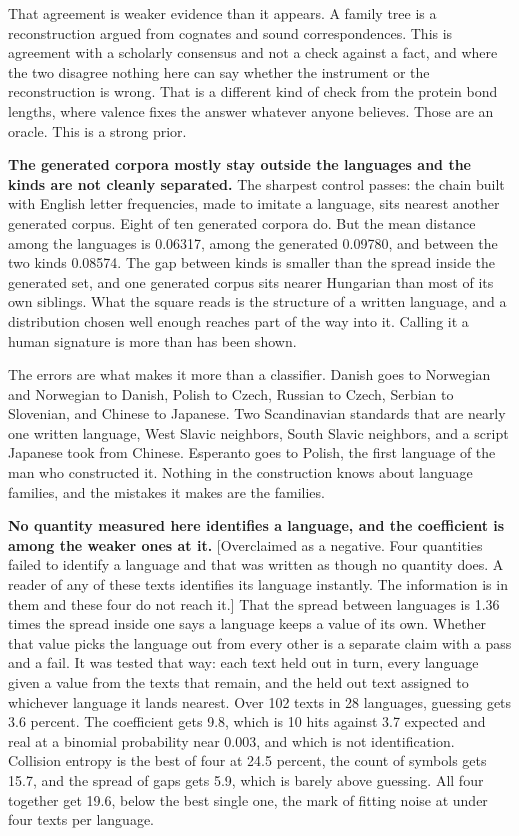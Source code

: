 That agreement is weaker evidence than it appears. A family tree is a reconstruction argued from cognates and sound correspondences. This is agreement with a scholarly consensus and not a check against a fact, and where the two disagree nothing here can say whether the instrument or the reconstruction is wrong. That is a different kind of check from the protein bond lengths, where valence fixes the answer whatever anyone believes. Those are an oracle. This is a strong prior.

\textbf{The generated corpora mostly stay outside the languages and the kinds are not cleanly separated.} The sharpest control passes: the chain built with English letter frequencies, made to imitate a language, sits nearest another generated corpus. Eight of ten generated corpora do. But the mean distance among the languages is 0.06317, among the generated 0.09780, and between the two kinds 0.08574. The gap between kinds is smaller than the spread inside the generated set, and one generated corpus sits nearer Hungarian than most of its own siblings. What the square reads is the structure of a written language, and a distribution chosen well enough reaches part of the way into it. Calling it a human signature is more than has been shown.

The errors are what makes it more than a classifier. Danish goes to Norwegian and Norwegian to Danish, Polish to Czech, Russian to Czech, Serbian to Slovenian, and Chinese to Japanese. Two Scandinavian standards that are nearly one written language, West Slavic neighbors, South Slavic neighbors, and a script Japanese took from Chinese. Esperanto goes to Polish, the first language of the man who constructed it. Nothing in the construction knows about language families, and the mistakes it makes are the families.

\textbf{No quantity measured here identifies a language, and the coefficient is among the weaker ones at it.} [Overclaimed as a negative. Four quantities failed to identify a language and that was written as though no quantity does. A reader of any of these texts identifies its language instantly. The information is in them and these four do not reach it.] That the spread between languages is 1.36 times the spread inside one says a language keeps a value of its own. Whether that value picks the language out from every other is a separate claim with a pass and a fail. It was tested that way: each text held out in turn, every language given a value from the texts that remain, and the held out text assigned to whichever language it lands nearest. Over 102 texts in 28 languages, guessing gets 3.6 percent. The coefficient gets 9.8, which is 10 hits against 3.7 expected and real at a binomial probability near 0.003, and which is not identification. Collision entropy is the best of four at 24.5 percent, the count of symbols gets 15.7, and the spread of gaps gets 5.9, which is barely above guessing. All four together get 19.6, below the best single one, the mark of fitting noise at under four texts per language.

